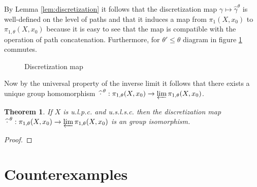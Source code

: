 \documentclass[a4paper, 11pt, twoside]{article}
\theoremstyle{break}
\newtheorem{thm}{Theorem}[section]
\theoremstyle{break}
\begin{document}
By Lemma \ref{lem:discretization} it follows that the discretization map $\gamma \mapsto \widehat{\gamma}^{\theta}$ is well-defined on the level of paths
and that it induces a map from $\pi_1(X, x_0)$ to $\pi_{1,\theta}(X, x_0)$ because it is easy to see that the map is compatible with the operation of path concatenation.
Furthermore, for $\theta' \leq \theta$ diagram in figure \ref{fig:discretization} commutes.

\begin{figure}[ht!]
  \centering
  \caption{Discretization map}\label{fig:discretization}
\end{figure}

Now by the universal property of the inverse limit it follows that there exists a unique group homomorphism $\: \widehat{\cdot}^{\hspace*{2px}\theta}: \pi_{1,\theta}(X, x_0) \to \varprojlim \pi_{1,\theta}(X, x_0)$.

\begin{thm}
  If $X$ is u.l.p.c. and u.s.l.s.c. then the discretization map $\: \widehat{\cdot}^{\hspace*{2px}\theta}: \pi_{1,\theta}(X, x_0) \to \varprojlim \pi_{1,\theta}(X, x_0)$ is an group isomorphism.
\end{thm}

\begin{proof}
\end{proof}

\section{Counterexamples}

\clearpage

\end{document}
